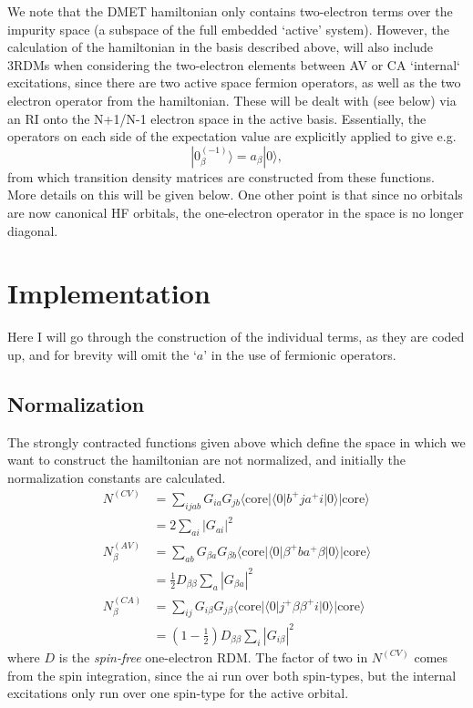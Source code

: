 \documentclass[a4paper,oneside,11pt]{article}
\numberwithin{equation}{section}
\newcommand{\DMETBra}{\langle \mathrm{core}|\langle 0|}
\newcommand{\DMETKet}{|0\rangle| \mathrm{core} \rangle}
\begin{document}
We note that the DMET hamiltonian only contains two-electron terms over the impurity space (a subspace of the full embedded `active' system). However, the calculation of the hamiltonian in the 
basis described above, will also include 3RDMs when considering the two-electron elements between AV or CA `internal` excitations, since there are two active space fermion operators, as well as the 
two electron operator from the hamiltonian. These will be dealt with (see below) via an RI onto the N+1/N-1 electron space in the active basis. Essentially, the operators on each side of the
expectation value are explicitly applied to give e.g.
\begin{equation}
|0^{(-1)}_{\beta} \rangle = a_{\beta} |0\rangle ,
\end{equation}
from which transition density matrices are constructed from these functions. More details on this will be given below. One other point is that since no orbitals are now canonical HF orbitals,
the one-electron operator in the space is no longer diagonal.

\section{Implementation}
Here I will go through the construction of the individual terms, as they are coded up, and for brevity will omit the `$a$' in the use of fermionic operators.
\subsection{Normalization}
The strongly contracted functions given above which define the space in which we want to construct the hamiltonian are not normalized, and initially the normalization constants are calculated.
\begin{align}
N^{(CV)} &= \sum_{ijab} G_{ia} G_{jb} \DMETBra b^{+} j a^{+} i \DMETKet \\
&= 2\sum_{ai} |G_{ai}|^2    \\
N^{(AV)}_{\beta} &= \sum_{ab} G_{\beta a} G_{\beta b} \DMETBra \beta^{+} b a^{+} \beta \DMETKet \\
&= \frac{1}{2} D_{\beta \beta} \sum_{a} |G_{\beta a}|^2    \label{AVNorm} \\
N^{(CA)}_{\beta} &= \sum_{ij} G_{i \beta} G_{j \beta} \DMETBra j^{+} \beta \beta^{+} i \DMETKet \\
&= \left(1-\frac{1}{2} \right) D_{\beta \beta} \sum_{i} |G_{i \beta}|^2     \label{CANorm}
\end{align}
where $D$ is the {\em spin-free} one-electron RDM. The factor of two in $N^{(CV)}$ comes from the spin integration, since the ai run over both spin-types, but the internal excitations only
run over one spin-type for the active orbital.
\end{document}
